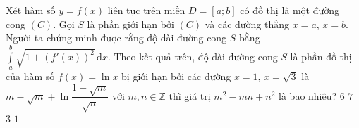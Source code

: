 \begin{ex}%
Xét hàm số $y=f(x)$ liên tục trên miền $ D=\left[a;b\right] $ có đồ thị là một đường cong $(C)$. Gọi $S$ là phần giới hạn bởi $(C)$ và các đường thẳng $x=a$, $x=b$. Người ta chứng minh được rằng độ dài đường cong $S$ bằng $ \displaystyle\int\limits_a^b{\sqrt{1+(f'(x))^2}\mathrm{\,d}x} $. Theo kết quả trên, độ dài đường cong $S$ là phần đồ thị của hàm số $f(x)=\ln x$ bị giới hạn bởi các đường $ x=1 $, $x=\sqrt{3}$ là $ m-\sqrt{m}+\ln\dfrac{1+\sqrt{m}}{\sqrt{n}} $ với $m, n \in \mathbb{Z}$ thì giá trị $m^2-mn+n^2$ là bao nhiêu?
\choice
{$6$}
{\True $7$}
{$3$}
{$1$}
\end{ex}

